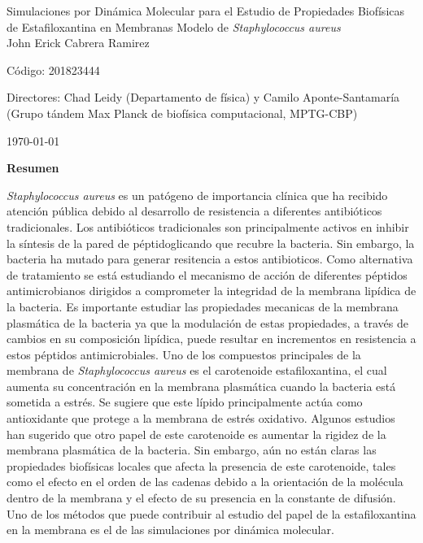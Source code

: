 \documentclass[12pt]{article}
\begin{document}
\begin{center}
\LARGE
Simulaciones por Din\'{a}mica Molecular para el Estudio de Propiedades Biof\'{i}sicas de Estafiloxantina en Membranas Modelo de \textit{Staphylococcus aureus}\\
\vspace{3mm}
\large
John Erick Cabrera Ramirez 

 C\'odigo: 201823444


\vspace{2mm}
\large
Directores: Chad Leidy (Departamento
de física) y Camilo Aponte-Santamaría (Grupo tándem Max Planck de biofísica computacional, MPTG-CBP)

\normalsize
\vspace{2mm}

\today
\end{center}
\begin{center}
\textbf{\LARGE Resumen}
\end{center}
\textit{Staphylococcus aureus} es un pat\'{o}geno de importancia cl\'{i}nica que ha recibido atenci\'{o}n p\'{u}blica debido al desarrollo de resistencia a diferentes antibi\'{o}ticos tradicionales. Los antibi\'{o}ticos tradicionales son principalmente activos en inhibir la s\'{i}ntesis de la pared de p\'{e}ptidoglicando que recubre la bacteria. Sin embargo, la bacteria ha mutado para generar resitencia a estos antibioticos. Como alternativa de tratamiento se est\'{a} estudiando el mecanismo de acci\'{o}n de diferentes p\'{e}ptidos antimicrobianos dirigidos a comprometer la integridad de la membrana lip\'{i}dica de la bacteria. Es importante estudiar las propiedades mecanicas de la membrana plasm\'{a}tica de la bacteria ya que la modulaci\'{o}n de estas propiedades, a trav\'{e}s de cambios en su composici\'{o}n lip\'{i}dica, puede resultar en incrementos en resistencia a estos p\'{e}ptidos antimicrobiales. Uno de los compuestos principales de la membrana de \textit{Staphylococcus aureus} es  el carotenoide estafiloxantina, el cual aumenta  su concentraci\'{o}n en la membrana plasm\'{a}tica cuando la bacteria est\'{a} sometida a estr\'{e}s. Se sugiere que este l\'{i}pido principalmente act\'{u}a como antioxidante que protege a la membrana de estr\'{e}s oxidativo. Algunos estudios han sugerido que otro papel de este carotenoide es aumentar la rigidez de la membrana plasm\'{a}tica de la bacteria. Sin embargo, a\'{u}n no est\'{a}n claras las propiedades biof\'{i}sicas locales que afecta la presencia de este carotenoide, tales como el efecto en el orden de las cadenas debido a la orientaci\'{o}n de la mol\'{e}cula dentro de la membrana y el efecto de su presencia en la constante de difusi\'{o}n. Uno de los m\'{e}todos que puede contribuir al estudio del papel de la estafiloxantina en la membrana es el de las simulaciones por din\'{a}mica molecular.\\
\end{document}
